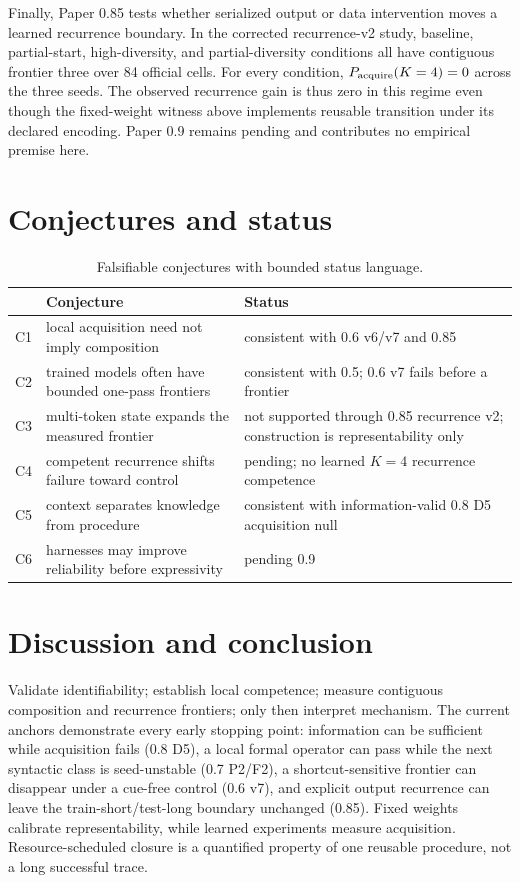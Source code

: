 \documentclass[10pt]{article}
\begin{document}
Finally, Paper 0.85 tests whether serialized output or data intervention moves a
learned recurrence boundary. In the corrected recurrence-v2 study, baseline,
partial-start, high-diversity, and partial-diversity conditions all have contiguous
frontier three over 84 official cells. For every condition,
$P_{\rm acquire}(K=4)=0$ across the three seeds. The observed recurrence gain is thus
zero in this regime even though the fixed-weight witness above implements reusable
transition under its declared encoding. Paper 0.9 remains pending and contributes no
empirical premise here.

\section{Conjectures and status}
\begin{table}[H]\centering\small
\begin{tabularx}{\linewidth}{p{.06\linewidth}p{.44\linewidth}Y}\toprule&Conjecture&Status\\\midrule C1&local acquisition need not imply composition&consistent with 0.6 v6/v7 and 0.85\\ C2&trained models often have bounded one-pass frontiers&consistent with 0.5; 0.6 v7 fails before a frontier\\ C3&multi-token state expands the measured frontier&not supported through 0.85 recurrence v2; construction is representability only\\ C4&competent recurrence shifts failure toward control&pending; no learned $K=4$ recurrence competence\\ C5&context separates knowledge from procedure&consistent with information-valid 0.8 D5 acquisition null\\ C6&harnesses may improve reliability before expressivity&pending 0.9\\\bottomrule\end{tabularx}
\caption{Falsifiable conjectures with bounded status language.}\end{table}

\section{Discussion and conclusion}
Validate identifiability; establish local competence; measure contiguous composition and recurrence frontiers; only then interpret mechanism. The current anchors demonstrate every early stopping point: information can be sufficient while acquisition fails (0.8 D5), a local formal operator can pass while the next syntactic class is seed-unstable (0.7 P2/F2), a shortcut-sensitive frontier can disappear under a cue-free control (0.6 v7), and explicit output recurrence can leave the train-short/test-long boundary unchanged (0.85). Fixed weights calibrate representability, while learned experiments measure acquisition. Resource-scheduled closure is a quantified property of one reusable procedure, not a long successful trace.
\end{document}
